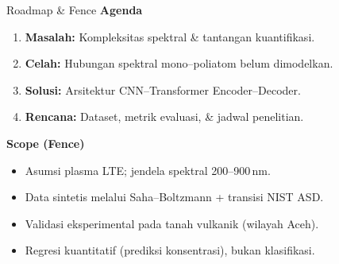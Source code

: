 \documentclass{beamer}
\begin{document}
\begin{frame}{Roadmap \& Fence}
  \textbf{Agenda}
  \begin{enumerate}\setlength{\itemsep}{1pt}
    \item \textbf{Masalah:} Kompleksitas spektral \& tantangan kuantifikasi.
    \item \textbf{Celah:} Hubungan spektral mono--poliatom belum dimodelkan.
    \item \textbf{Solusi:} Arsitektur CNN--Transformer Encoder--Decoder.
    \item \textbf{Rencana:} Dataset, metrik evaluasi, \& jadwal penelitian.
  \end{enumerate}
  \vspace{0.4em}
  \textbf{Scope (Fence)}
  \begin{itemize}\setlength{\itemsep}{1pt}
    \item Asumsi plasma LTE; jendela spektral 200--900\,nm.
    \item Data sintetis melalui Saha--Boltzmann + transisi NIST ASD.
    \item Validasi eksperimental pada tanah vulkanik (wilayah Aceh).
    \item Regresi kuantitatif (prediksi konsentrasi), bukan klasifikasi.
  \end{itemize}
\end{frame}
\end{document}
